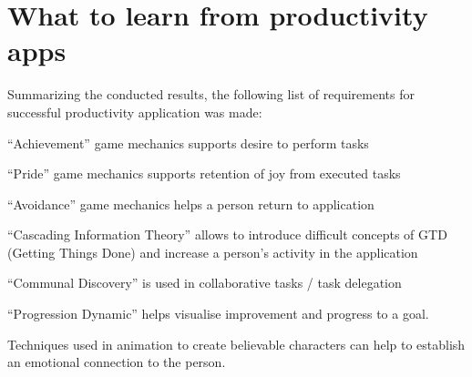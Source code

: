 \section{What to learn from productivity apps}

Summarizing the conducted results, the following list of requirements for successful productivity application was made:
\begin{compactitem}
\item ``Achievement'' game mechanics supports desire to perform tasks
\item ``Pride'' game mechanics supports retention of joy from executed tasks
\item ``Avoidance'' game mechanics helps a person return to application
\item ``Cascading Information Theory'' allows to introduce difficult concepts of GTD (Getting Things Done) and increase a person’s activity in the application
\item ``Communal Discovery'' is used in collaborative tasks / task delegation
\item ``Progression Dynamic'' helps visualise improvement and progress to a goal.
\end{compactitem}

Techniques used in animation to create believable characters can help to establish an emotional connection to the person.
